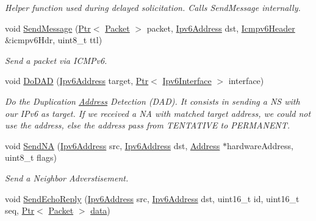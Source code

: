 \begin{DoxyCompactItemize}
\begin{DoxyCompactList}\small\item\em Helper function used during delayed solicitation. Calls Send\+Message internally. \end{DoxyCompactList}\item 
void \hyperlink{classns3_1_1Icmpv6L4Protocol_a62a9a177dd81ee6d5323e50b0954ed70}{Send\+Message} (\hyperlink{classns3_1_1Ptr}{Ptr}$<$ \hyperlink{classns3_1_1Packet}{Packet} $>$ packet, \hyperlink{classns3_1_1Ipv6Address}{Ipv6\+Address} dst, \hyperlink{classns3_1_1Icmpv6Header}{Icmpv6\+Header} \&icmpv6\+Hdr, uint8\+\_\+t ttl)
\begin{DoxyCompactList}\small\item\em Send a packet via I\+C\+M\+Pv6. \end{DoxyCompactList}\item 
void \hyperlink{classns3_1_1Icmpv6L4Protocol_a926ea8e638e30cee8c3c17d4141f3f58}{Do\+D\+AD} (\hyperlink{classns3_1_1Ipv6Address}{Ipv6\+Address} target, \hyperlink{classns3_1_1Ptr}{Ptr}$<$ \hyperlink{classns3_1_1Ipv6Interface}{Ipv6\+Interface} $>$ interface)
\begin{DoxyCompactList}\small\item\em Do the Duplication \hyperlink{classns3_1_1Address}{Address} Detection (D\+AD). It consists in sending a NS with our I\+Pv6 as target. If we received a NA with matched target address, we could not use the address, else the address pass from T\+E\+N\+T\+A\+T\+I\+VE to P\+E\+R\+M\+A\+N\+E\+NT. \end{DoxyCompactList}\item 
void \hyperlink{classns3_1_1Icmpv6L4Protocol_ae4324a775e75486fad5de41ec3030a0c}{Send\+NA} (\hyperlink{classns3_1_1Ipv6Address}{Ipv6\+Address} src, \hyperlink{classns3_1_1Ipv6Address}{Ipv6\+Address} dst, \hyperlink{classns3_1_1Address}{Address} $\ast$hardware\+Address, uint8\+\_\+t flags)
\begin{DoxyCompactList}\small\item\em Send a Neighbor Adverstisement. \end{DoxyCompactList}\item 
void \hyperlink{classns3_1_1Icmpv6L4Protocol_ad7408b6e4b818a857783a4ec373f2a66}{Send\+Echo\+Reply} (\hyperlink{classns3_1_1Ipv6Address}{Ipv6\+Address} src, \hyperlink{classns3_1_1Ipv6Address}{Ipv6\+Address} dst, uint16\+\_\+t id, uint16\+\_\+t seq, \hyperlink{classns3_1_1Ptr}{Ptr}$<$ \hyperlink{classns3_1_1Packet}{Packet} $>$ \hyperlink{topology-example-sim_8cc_a26c65296e316af77b787dc77469bb2a4}{data})

\end{DoxyCompactItemize}

